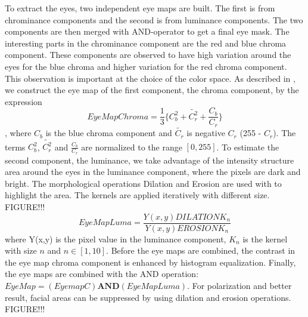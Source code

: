 


To extract the eyes, two independent eye maps are built. The first is from chrominance components and the second is from luminance components. The two components are then merged with AND-operator to get a final eye mask. The interesting parts in the chrominance component are the red and blue chroma component. These components are observed to have high variation around the eyes for the blue chroma and higher variation for the red chroma component. This observation is important at the choice of the color space. As described in \cite{fdInColorImages}, we construct the eye map of the first component, the chroma component, by the expression
\newline
\newline
\begin{equation}
EyeMapChroma = \frac{1}{3} \lbrace C_b^2 + \tilde{C_r^2} + \frac{C_b}{C_r} \rbrace
\end{equation}
\newline
\newline
, where $C_b$ is the blue chroma component and $\tilde{C_r}$ is negative $C_r$ (255 - $C_r$). The terms $C_b^2$, $\tilde{C_r^2}$ and $\frac{C_b}{C_r}$ are normalized to the range $[0, 255]$.
\newline
\newline
To estimate the second component, the luminance, we take advantage of the intensity structure area around the eyes in the luminance component, where the pixels are dark and bright. The morphological operations Dilation and Erosion are used with to highlight the area.  The kernels are applied iteratively with different size. FIGURE!!!
\newline
\newline
\begin{equation}
EyeMapLuma = \frac{Y(x,y) DILATION K_n}{Y(x,y) EROSION K_n}
\end{equation}
\newline
\newline
where Y(x,y) is the pixel value in the luminance component, $K_n$ is the kernel with size $n$ and $ n \in [1,10]$.
\newline
Before the eye maps are combined, the contrast in the eye map chroma component is enhanced by histogram equalization. Finally, the eye maps are combined with the AND operation: $EyeMap = (EyemapC) \textbf{AND} (EyeMapLuma)$. For polarization and better result, facial areas can be suppressed by using dilation and erosion operations. FIGURE!!!


